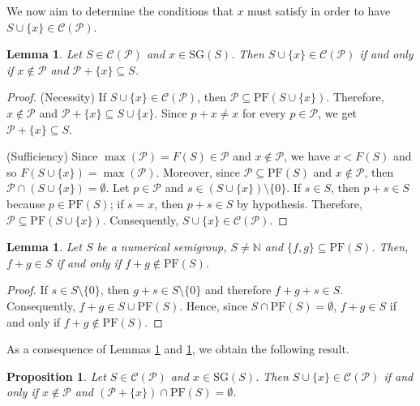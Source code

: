 \documentclass[11pt]{article}
\def\N{\mathbb{N}}
\newtheorem{proposition}[theorem]{Proposition}
\newtheorem{lemma}[theorem]{Lemma}
\numberwithin{equation}{section}
\newcommand{\PF}{\mathrm{PF}}
\begin{document}
We now aim to determine the conditions that $x$ must satisfy in order to have $S\cup\{x\}\in\mathcal C(\mathcal P)$.

\begin{lemma}\label{lema union hueco especial}
    Let $S\in\mathcal C(\mathcal P)$ and $x\in\mathrm{SG}(S)$. Then $S\cup\{x\}\in\mathcal C(\mathcal P)$ if and only if $x\notin\mathcal P$ and $\mathcal P+\{x\}\subseteq S$.
\end{lemma}

\begin{proof}
    (Necessity) If $S\cup\{x\}\in\mathcal C(\mathcal P)$, then $\mathcal P\subseteq\mathrm{PF}(S\cup\{x\})$. Therefore, $x\notin\mathcal P$ and $\mathcal P+\{x\}\subseteq S\cup\{x\}$. Since $p+x\neq x$ for every $p\in\mathcal P$, we get $\mathcal P+\{x\}\subseteq S$.

\noindent (Sufficiency) Since $\max(\mathcal P)=F(S)\in\mathcal P$ and $x\notin\mathcal P$, we have $x<F(S)$ and so $F(S \cup \{x\}) = \max(\mathcal{P})$. Moreover, since $\mathcal{P} \subseteq \mathrm{PF}(S)$ and $x\notin\mathcal P$, then $\mathcal P\cap(S\cup\{x\})=\emptyset$. Let $p\in\mathcal P$ and $s\in (S\cup\{x\})\setminus\{0\}$. If $s\in S$, then $p+s\in S$ because $p\in\PF(S)$; if $s=x$, then $p+s\in S$ by hypothesis. Therefore, $\mathcal P\subseteq\mathrm{PF}(S\cup\{x\})$. Consequently, $S\cup \{x\}\in\mathcal C(\mathcal P)$.
\end{proof}

\begin{lemma}\label{lema suma de pseudo-Frobenius}
    Let $S$ be a numerical semigroup, $S\ne\N$ and $\{f,g\}\subseteq\mathrm{PF}(S)$. Then, $f+g\in S$ if and only if $f+g\notin\mathrm{PF}(S)$.
\end{lemma}

\begin{proof}
    If $s\in S\setminus\{0\}$, then $g+s\in S\setminus\{0\}$ and therefore $f+g+s\in S$. Consequently, $f+g\in S\cup\mathrm{PF}(S)$. Hence, since $S\cap\PF(S)=\emptyset$, $f+g\in S$ if and only if $f+g\notin\mathrm{PF}(S)$.
\end{proof}

As a consequence of Lemmas \ref{lema union hueco especial} and \ref{lema suma de pseudo-Frobenius}, we obtain the following result.

\begin{proposition}\label{proposicion interseccion P y pseudos}
    Let $S\in\mathcal C(\mathcal P)$ and $x\in\mathrm{SG}(S)$. Then $S\cup\{x\}\in\mathcal C(\mathcal P)$ if and only if $x\notin\mathcal P$ and $(\mathcal P+\{x\})\cap\mathrm{PF}(S)=\emptyset$.
\end{proposition}
\end{document}
